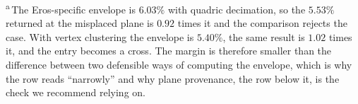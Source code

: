 \vspace{2pt}
\begin{minipage}{\textwidth}
\footnotesize
\textsuperscript{a}\,The Eros-specific envelope is $6.03\%$ with quadric
decimation, so the $5.53\%$ returned at the misplaced plane is $0.92$ times
it and the comparison rejects the case. With vertex clustering the envelope
is $5.40\%$, the same result is $1.02$ times it, and the entry becomes a
cross. The margin is therefore smaller than the difference between two
defensible ways of computing the envelope, which is why the row reads
``narrowly'' and why plane provenance, the row below it, is the check we
recommend relying on.
\end{minipage}
